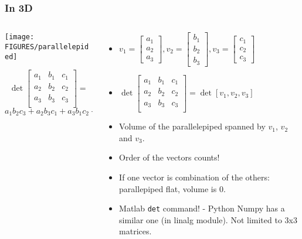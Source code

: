 \documentclass[8pt]{beamer}
\begin{document}
\begin{frame}
  \frametitle{In 3D}
  \begin{columns}
    \begin{column}{0.4\textwidth}
      \begin{center}
        \texttt{[image: FIGURES/parallelepided]}  
      \end{center}
       $$\det
      \begin{bmatrix}
        a_1 & b_1 & c_1\\
        a_2 & b_2 & c_2\\
        a_3 & b_3 & c_3\\
      \end{bmatrix}=
      $$
      $
      a_1 b_2 c_3 + a_2 b_3 c_1 + a_3 b_1 c_2 -a_2 b_1 c_3 -a_1 b_3 c_2 -a_3 b_2 c_1
      $
    \end{column}
    \begin{column}{0.6\textwidth}
      \begin{itemize}
      \item  $v_1 =
      \begin{bmatrix}
        a_1\\a_2\\a_3
      \end{bmatrix},
      v_2 =
      \begin{bmatrix}
        b_1\\b_2\\b_3
      \end{bmatrix}
      ,v_3 =
      \begin{bmatrix}
        c_1\\c_2\\c_3
      \end{bmatrix}$
    \item
      $\det
      \begin{bmatrix}
        a_1 & b_1 & c_1\\
        a_2 & b_2 & c_2\\
        a_3 & b_3 & c_3\\
      \end{bmatrix}
      = \det [v_1, v_2, v_3]
      $
      \item Volume of the parallelepiped spanned by $v_1$, $v_2$ and $v_3$.
      \item Order of the vectors counts!
      \item If one vector is combination of the others: parallepiped flat, volume is 0.
      \item Matlab \texttt{det} command! - Python Numpy has a similar one (in linalg module). Not limited to 3x3 matrices.
      \end{itemize}
    \end{column}
  \end{columns}
\end{frame}
\end{document}
